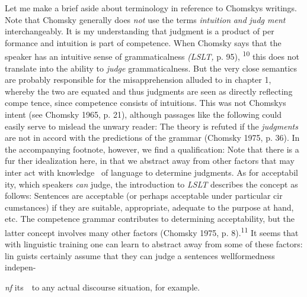 \begin{styleTextbody}
Let me make a brief aside about terminology in reference to Chomsky{\textquotesingle}s writings. Note that Chomsky generally does \textit{not}\textit{ }use the terms \textit{intuition}\textit{ }\textit{and}\textit{ }\textit{judg\- ment}\textit{ }interchangeably. It is my understanding that judgment is a product of per\- formance and intuition is part of competence. When Chomsky says that {\textquotedbl}the speaker has an {\textquotesingle}intuitive sense of grammaticalness{\textquotesingle}{\textquotedbl} \textit{(}\textit{LSLT,}\textit{ }p. 95), \textsuperscript{10}\textsuperscript{ }this does not translate into the ability to \textit{judge}\textit{ }grammaticalness. But the very close semantics are probably responsible for the misapprehension alluded to in chapter 1, whereby the two are equated and thus judgments are seen as directly reflecting compe\- tence, since competence consists of intuitions. This was not Chomsky{\textquotesingle}s intent (see Chomsky 1965, p. 21), although passages like the following could easily serve to mislead the unwary reader: {\textquotedbl}The theory is refuted if the \textit{judgments}\textit{ }are not in accord with the predictions of the grammar{\textquotedbl} (Chomsky 1975, p. 36). In the accompanying footnote, however, we find a qualification: {\textquotedbl}Note that there is a fur\- ther idealization here, in that we abstract away from other factors that may inter\- act with knowledge \ of language to determine judgments.{\textquotedbl} As for acceptabil\- ity, which speakers \textit{can}\textit{ }judge, the introduction to \textit{LSLT}\textit{ }describes the concept as follows: {\textquotedbl}Sentences are acceptable (or perhaps acceptable under particular cir\- cumstances) if they are suitable, appropriate, adequate to the purpose at hand, etc. The competence grammar contributes to determining acceptability, but the latter concept involves many other factors{\textquotedbl} (Chomsky 1975, p. 8).\textsuperscript{11}\textsuperscript{ }It seems that with linguistic training one can learn to abstract away from some of these factors: lin\- guists certainly assume that they can judge a sentence{\textquotesingle}s wellformedness indepen-
\end{styleTextbody}


\begin{styleTextbody}
\textit{nf}\textit{ }its\ \ to any actual discourse situation, for example.
\end{styleTextbody}


